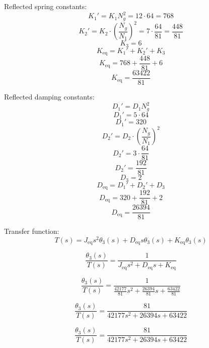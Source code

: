 Reflected spring constants:
\[
K_1' = K_1 N_g^2 = 12 \cdot 64 = 768
\]
\[
K_2' = K_2 \cdot \left( \frac{N_g}{N_1} \right)^2 = 7 \cdot \frac{64}{81} = \frac{448}{81}
\]
\[
K_3 = 6
\]
\[
K_{\text{eq}} = K_1' + K_2' + K_3 
\]
\[
K_{\text{eq}} = 768 + \frac{448}{81} + 6 
\]
\[
K_{\text{eq}} = \frac{63422}{81}
\]

Reflected damping constants:
\[
D_1' = D_1 N_g^2 
\]
\[
D_1' = 5 \cdot 64 
\]
\[
D_1' = 320
\]
\[
D_2' = D_2 \cdot \left( \frac{N_g}{N_1} \right)^2 
\]
\[
D_2' = 3 \cdot \frac{64}{81} 
\]
\[
D_2' = \frac{192}{81}
\]
\[
D_3 = 2
\]
\[
D_{\text{eq}} = D_1' + D_2' + D_3 
\]
\[
D_{\text{eq}} = 320 + \frac{192}{81} + 2 
\]
\[
D_{\text{eq}} = \frac{26394}{81}
\]

Transfer function:
\[
T(s) = J_{\text{eq}} s^2 \theta_3(s) + D_{\text{eq}} s \theta_3(s) + K_{\text{eq}} \theta_3(s)
\]

\[
\frac{\theta_3(s)}{T(s)} = \frac{1}{J_{\text{eq}} s^2 + D_{\text{eq}} s + K_{\text{eq}}}
\]

\[
\frac{\theta_3(s)}{T(s)} = \frac{1}{\frac{42177}{81} s^2 + \frac{26394}{81} s + \frac{63422}{81}}
\]

\[
\frac{\theta_3(s)}{T(s)} = \frac{81}{42177 s^2 + 26394 s + 63422}
\]

\[
\boxed{\frac{\theta_3(s)}{T(s)} = \frac{81}{42177 s^2 + 26394 s + 63422}}
\]
